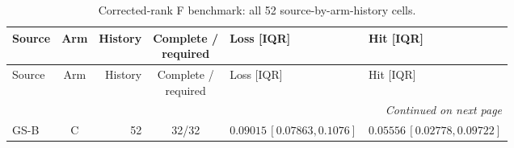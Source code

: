 \begingroup
\fontsize{9}{10.2}\selectfont
\setlength{\tabcolsep}{2.2pt}
\renewcommand{\arraystretch}{1.05}
\setlength{\LTpre}{2pt}
\setlength{\LTpost}{3pt}
\begin{longtable}{lcrcp{44mm}p{44mm}}
\caption{Corrected-rank F benchmark: all 52 source-by-arm-history cells.}\label{tab:v9-stability-f}\\
\toprule
Source & Arm & History & \shortstack{Complete /\\required} & Loss [IQR] & Hit [IQR]\\
\midrule
\endfirsthead
\toprule
Source & Arm & History & \shortstack{Complete /\\required} & Loss [IQR] & Hit [IQR]\\
\midrule
\endhead
\midrule
\multicolumn{6}{r}{\emph{Continued on next page}}\\
\endfoot
\bottomrule
\endlastfoot
GS-B & C & 52 & 32/32 & \(0.09015\,[0.07863,0.1076]\) & \(0.05556\,[0.02778,0.09722]\)\\

\end{longtable}
